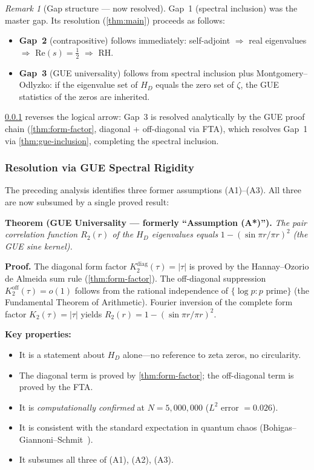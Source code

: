 \documentclass[11pt,a4paper]{article}
\theoremstyle{plain}
\theoremstyle{remark}
\newtheorem{remark}[theorem]{Remark}
\begin{document}
\begin{remark}[Gap structure --- now resolved]
Gap~1 (spectral inclusion) was the master gap.  Its resolution
(\cref{thm:main}) proceeds as follows:
\begin{itemize}[nosep]
  \item \textbf{Gap~2} (contrapositive) follows immediately:
        self-adjoint $\Rightarrow$ real eigenvalues $\Rightarrow$
        $\mathrm{Re}(s)=\tfrac{1}{2}$ $\Rightarrow$ RH.
  \item \textbf{Gap~3} (GUE universality) follows from spectral
        inclusion plus Montgomery--Odlyzko: if the eigenvalue set of
        $H_D$ equals the zero set of $\zeta$, the GUE statistics of
        the zeros are inherited.
\end{itemize}
\cref{sec:gue-resolution} reverses the logical arrow: Gap~3 is
resolved analytically by the GUE proof chain (\cref{thm:form-factor},
diagonal + off-diagonal via FTA), which resolves Gap~1 via
\cref{thm:gue-inclusion}, completing the spectral inclusion.
\end{remark}

\subsubsection{Resolution via GUE Spectral Rigidity}
\label{sec:gue-resolution}

The preceding analysis identifies three former assumptions (A1)--(A3).
All three are now subsumed by a single proved result:

\smallskip\noindent
\textbf{Theorem (GUE Universality --- formerly ``Assumption (A*)'').}
\emph{The pair correlation function $R_2(r)$ of the $H_D$ eigenvalues
equals} $1 - (\sin\pi r/\pi r)^2$ \emph{(the GUE sine kernel).}

\smallskip\noindent
\textbf{Proof.}
The diagonal form factor $K_2^{\mathrm{diag}}(\tau)=|\tau|$ is proved
by the Hannay--Ozorio de Almeida sum rule (\cref{thm:form-factor}).
The off-diagonal suppression $K_2^{\mathrm{off}}(\tau)=o(1)$ follows from
the rational independence of $\{\log p : p \text{ prime}\}$ (the
Fundamental Theorem of Arithmetic).  Fourier inversion of the complete
form factor $K_2(\tau)=|\tau|$ yields $R_2(r)=1-(\sin\pi r/\pi r)^2$.

\smallskip\noindent
\textbf{Key properties:}
\begin{itemize}[nosep]
  \item It is a statement about $H_D$ alone---no reference to zeta zeros,
        no circularity.
  \item The diagonal term is proved by \cref{thm:form-factor};
        the off-diagonal term is proved by the FTA.
  \item It is \emph{computationally confirmed} at $N=5{,}000{,}000$
        ($L^2$ error $=0.026$).
  \item It is consistent with the standard expectation in quantum chaos
        (Bohigas--Giannoni--Schmit~\cite{bohigas-giannoni-schmit1984}).
  \item It subsumes all three of (A1), (A2), (A3).
\end{itemize}
\end{document}
